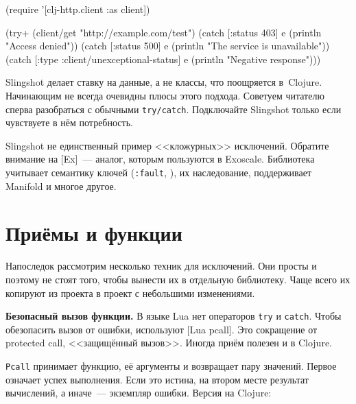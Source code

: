 \else

\begin{english}
  \begin{clojure}
(require '[clj-http.client :as client])

(try+
 (client/get "http://example.com/test")
 (catch [:status 403] e
  (println "Access denied"))
 (catch [:status 500] e
   (println "The service is unavailable"))
 (catch [:type :client/unexceptional-status] e
   (println "Negative response")))
  \end{clojure}
\end{english}

\fi

Slingshot делает ставку на данные, а не классы, что поощряется
в~Clojure. Начинающим не всегда очевидны плюсы этого подхода. Советуем читателю
сперва разобраться с обычными \verb|try/catch|. Подключайте Slingshot только
если чувствуете в нём потребность.


Slingshot не единственный пример <<кложурных>> исключений. Обратите внимание на
[Ex]~--- аналог, которым пользуются
в Exoscale. Библиотека учитывает семантику ключей (\verb|:fault|,
), их наследование, поддерживает Manifold и многое другое.

\section{Приёмы и функции}

Напоследок рассмотрим несколько техник для исключений. Они просты и поэтому не
стоят того, чтобы вынести их в отдельную библиотеку. Чаще всего их копируют из
проекта в проект с небольшими изменениями.


\label{pcall}

\textbf{Безопасный вызов функции.} В языке Lua нет операторов \verb|try| и
\verb|catch|. Чтобы обезопасить вызов от ошибки, используют
[Lua pcall]. Это сокращение от
protected call, <<защищённый вызов>>. Иногда приём полезен и в Clojure.

\verb|Pcall| принимает функцию, её аргументы и возвращает пару значений. Первое
означает успех выполнения. Если это истина, на втором месте результат
вычислений, а иначе~--- экземпляр ошибки. Версия на Clojure:


